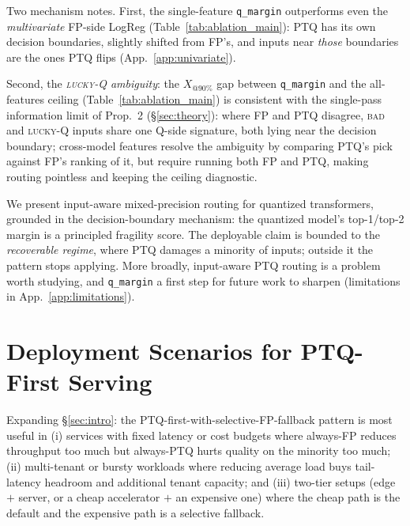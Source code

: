 \documentclass{article}
\makeatletter
\newcommand{\fp}{\textsc{FP}\xspace}
\newcommand{\ptq}{\textsc{PTQ}\xspace}
\newcommand{\bad}{\textsc{bad}\xspace}
\newcommand{\luckyq}{\textsc{lucky-Q}\xspace}
\newcommand{\xat}[1]{\ensuremath{X_{@#1\%}}}
\makeatother
\begin{document}
Two mechanism notes. First, the single-feature \texttt{q\_margin} outperforms even the \emph{multivariate} FP-side LogReg (Table~\ref{tab:ablation_main}): \ptq{} has its own decision boundaries, slightly shifted from \fp's, and inputs near \emph{those} boundaries are the ones \ptq{} flips (App.~\ref{app:univariate}).

Second, the \emph{\luckyq{} ambiguity}: the \xat{90} gap between \texttt{q\_margin} and the all-features ceiling (Table~\ref{tab:ablation_main}) is consistent with the single-pass information limit of Prop.~2 (\S\ref{sec:theory}): where \fp{} and \ptq{} disagree, \bad{} and \luckyq{} inputs share one Q-side signature, both lying near the decision boundary; cross-model features resolve the ambiguity by comparing \ptq's pick against \fp's ranking of it, but require running both \fp and \ptq, making routing pointless and keeping the ceiling diagnostic.

We present input-aware mixed-precision routing for quantized transformers, grounded in the decision-boundary mechanism: the quantized model's top-1/top-2 margin is a principled fragility score. The deployable claim is bounded to the \emph{recoverable regime}, where \ptq{} damages a minority of inputs; outside it the pattern stops applying. More broadly, input-aware \ptq{} routing is a problem worth studying, and \texttt{q\_margin} a first step for future work to sharpen (limitations in App.~\ref{app:limitations}).





\appendix

\section{Deployment Scenarios for \ptq-First Serving}\label{app:deploy}

Expanding \S\ref{sec:intro}: the \ptq-first-with-selective-\fp-fallback pattern is most useful in
(i) services with fixed latency or cost budgets where always-\fp{} reduces throughput too much but always-\ptq{} hurts quality on the minority too much;
(ii) multi-tenant or bursty workloads where reducing average load buys tail-latency headroom and additional tenant capacity; and
(iii) two-tier setups (edge $+$ server, or a cheap accelerator $+$ an expensive one) where the cheap path is the default and the expensive path is a selective fallback.
\end{document}
